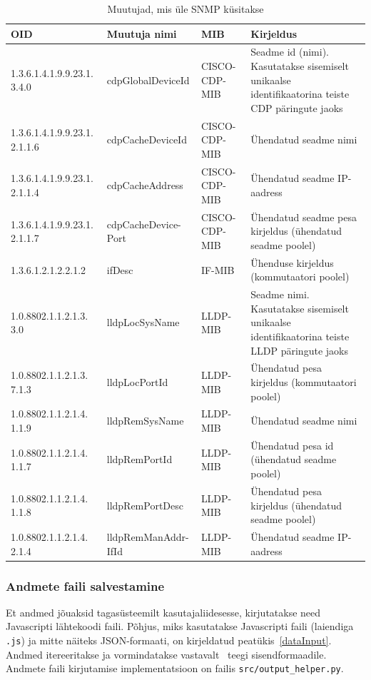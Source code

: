 \documentclass[12pt]{article}
\begin{document}
\begin{table}[p]
\centering
\caption{Muutujad, mis üle SNMP küsitakse}
    \begin{tabularx}{\textwidth}{| X | X | X | X |}
    \hline
        OID & Muutuja nimi & MIB & Kirjeldus \\
    \hline
        1.3.6.1.4.1.9.9.23.1. 3.4.0 & cdpGlobalDeviceId & CISCO-CDP-MIB & Seadme id (nimi). Kasutatakse sisemiselt unikaalse identifikaatorina teiste CDP päringute jaoks \\
    \hline
        1.3.6.1.4.1.9.9.23.1. 2.1.1.6 & cdpCacheDeviceId & CISCO-CDP-MIB & Ühendatud seadme nimi \\
    \hline
        1.3.6.1.4.1.9.9.23.1. 2.1.1.4 & cdpCacheAddress & CISCO-CDP-MIB & Ühendatud seadme IP-aadress \\
    \hline
        1.3.6.1.4.1.9.9.23.1. 2.1.1.7 & cdpCacheDevice-Port & CISCO-CDP-MIB & Ühendatud seadme pesa kirjeldus (ühendatud seadme poolel) \\
    \hline
        1.3.6.1.2.1.2.2.1.2 & ifDesc & IF-MIB & Ühenduse kirjeldus (kommutaatori poolel) \\
    \hline
        1.0.8802.1.1.2.1.3. 3.0 & lldpLocSysName & LLDP-MIB & Seadme nimi. Kasutatakse sisemiselt unikaalse identifikaatorina teiste LLDP päringute jaoks \\
    \hline
        1.0.8802.1.1.2.1.3. 7.1.3 & lldpLocPortId & LLDP-MIB & Ühendatud pesa kirjeldus (kommutaatori poolel) \\
    \hline
        1.0.8802.1.1.2.1.4. 1.1.9 & lldpRemSysName & LLDP-MIB & Ühendatud seadme nimi \\
    \hline
        1.0.8802.1.1.2.1.4. 1.1.7 & lldpRemPortId & LLDP-MIB & Ühendatud pesa id (ühendatud seadme poolel) \\
    \hline
        1.0.8802.1.1.2.1.4. 1.1.8 & lldpRemPortDesc & LLDP-MIB & Ühendatud pesa kirjeldus (ühendatud seadme poolel) \\
    \hline
        1.0.8802.1.1.2.1.4. 2.1.4 & lldpRemManAddr-IfId & LLDP-MIB & Ühendatud seadme IP-aadress \\

    \hline
\end{tabularx}
\label{tab:oids}
\end{table}

\subsubsection{Andmete faili salvestamine} \label{backendOutput}
Et andmed jõuaksid tagasüsteemilt kasutajaliidesesse, kirjutatakse need Javascripti lähtekoodi
faili.
Põhjus, miks kasutatakse Javascripti faili (laiendiga \texttt{.js}) ja mitte näiteks JSON-formaati,
on kirjeldatud peatükis~\ref{dataInput}.
Andmed itereeritakse ja vormindatakse vastavalt~ teegi sisendformaadile.
Andmete faili kirjutamise implementatsioon on failis \texttt{src/output\_helper.py}.
\end{document}
